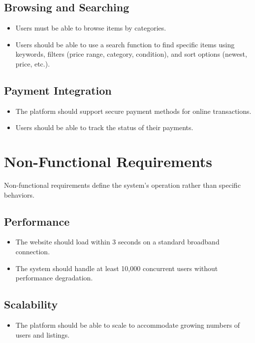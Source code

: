 \subsection{Browsing and Searching}
\begin{itemize}
        \item Users must be able to browse items by categories.
        \item Users should be able to use a search function to find specific items using keywords, filters (price range, category, condition), and sort options (newest, price, etc.).
\end{itemize}

\subsection{Payment Integration}
\begin{itemize}
        \item The platform should support secure payment methods for online transactions.
        \item Users should be able to track the status of their payments.
\end{itemize}

\section{Non-Functional Requirements}
Non-functional requirements define the system's operation rather than specific behaviors.
\subsection{Performance}
\begin{itemize}
        \item The website should load within 3 seconds on a standard broadband connection.
        \item The system should handle at least 10,000 concurrent users without performance degradation.
\end{itemize}

\subsection{Scalability}
\begin{itemize}
        \item The platform should be able to scale to accommodate growing numbers of users and listings.
\end{itemize}

